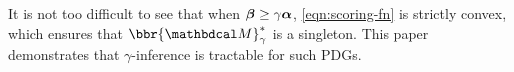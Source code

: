 \documentclass[twoside]{article}
\newcommand\discard[1]{}
\begin{document}
It is not too difficult to see that when $\boldsymbol\beta \ge \gamma\boldsymbol\alpha$, 
 \eqref{eqn:scoring-fn} is strictly convex, which ensures that
 $\bbr{\dg M}^*_\gamma$ is a singleton.
This paper demonstrates
 that $\gamma$-inference is tractable for such PDGs.
%
\discard{%
    The former is a notational convenience,
    because for $\gamma \in (0, \infty)$,
    $\gamma$-inference is just $1$-inference for a
    slightly different PDG:
    $\bbr{
        \balpha, \bbeta}^*_\gamma = \bbr{
        \gamma \balpha, \bbeta}^*_1$.
    This paper demonstrates the tractability of
    1-inference for the specific case of PDGs satisfying $\bbeta \ge \balpha$, which is sufficient to ensure strict convexity of \eqref{eqn:scoring-fn}, and hence a unique optimal distribution.}%
\end{document}
